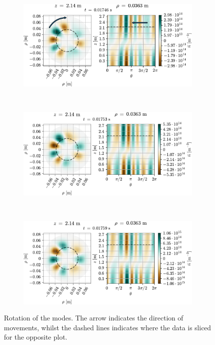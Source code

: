 %
{
\clearpage
\thispagestyle{empty}
\begin{figure}[htbp]
    \vspace*{-1cm}
    \centering
    \begin{subfigure}[h]{1.00\textwidth}
        \centering
        \includegraphics{fig/results/rotModes/n-perpPol-2D-fluct-0_rot}
        \label{fig:rot1}
    \end{subfigure}%
    \\
    \begin{subfigure}[h]{1.00\textwidth}
        \centering
        \includegraphics{fig/results/rotModes/n-perpPol-2D-fluct-1}
        \label{fig:rot2}
    \end{subfigure}
    \\
    \begin{subfigure}[h]{1.00\textwidth}
        \centering
        \includegraphics{fig/results/rotModes/n-perpPol-2D-fluct-2}
        \label{fig:rot3}
    \end{subfigure}
    \caption{Rotation of the modes.
        The arrow indicates the direction of movements, whilst the dashed lines indicates where the data is sliced for the opposite plot.
    }
    \label{fig:modeRotation}
\end{figure}
\clearpage
}
%

